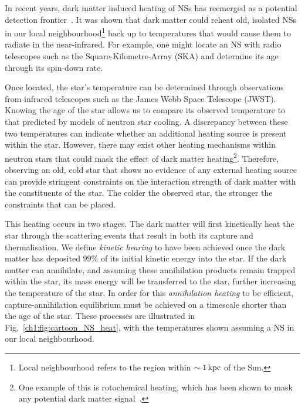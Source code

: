 In recent years, dark matter induced heating of NSs has reemerged as a potential detection frontier~\cite{Raj:2017wrv_feb_Neutronstarsdark, Baryakhtar:2017dbj_sep_DarkKineticHeating, Bell:2018pkk_sep_HeatingNeutronStars, Joglekar:2019vzy_sep_Relativisticcapturedark, Acevedo:2019agu_mar_WarmingNuclearPasta, Bell:2019pyc_jun_CaptureLeptophilicDark, Garani:2019fpa_aug_Darkmatterinteractions, Chatterjee:2022dhp_jul_Faintlightold}. It was shown that dark matter could reheat old, isolated NSs in our local neighbourhood\footnote{Local neighbourhood refers to the region within $\sim 1{\rm \,kpc}$ of the Sun.} back up to temperatures that would cause them to radiate in the near-infrared. 
For example, one might locate an NS with radio telescopes such as the Square-Kilometre-Array (SKA) and determine its age through its spin-down rate. 

Once located, the star's temperature can be determined through observations from infrared telescopes such as the James Webb Space Telescope (JWST). Knowing the age of the star allows us to compare its observed temperature to that predicted by models of neutron star cooling. A discrepancy between these two temperatures can indicate whether an additional heating source is present within the star. However, there may exist other heating mechanisms within neutron stars that could mask the effect of dark matter heating\footnote{One example of this is rotochemical heating, which has been shown to mask any potential dark matter signal~\cite{Hamaguchi:2019oev_aug_DarkMatterHeating}.}. Therefore, observing an old, cold star that shows no evidence of any external heating source can provide stringent constraints on the interaction strength of dark matter with the constituents of the star. The colder the observed star, the stronger the constraints that can be placed.

This heating occurs in two stages. The dark matter will first kinetically heat the star through the scattering events that result in both its capture and thermalisation. We define \textit{kinetic hearing} to have been achieved once the dark matter has deposited $99\%$ of its initial kinetic energy into the star.
If the dark matter can annihilate, and assuming these annihilation products remain trapped within the star, its mass energy will be transferred to the star, further increasing the temperature of the star. In order for this \textit{annihilation heating} to be efficient, capture-annihilation equilibrium must be achieved on a timescale shorter than the age of the star. These processes are illustrated in Fig.~\ref{ch1:fig:cartoon_NS_heat}, with the temperatures shown assuming a NS in our local neighbourhood.


